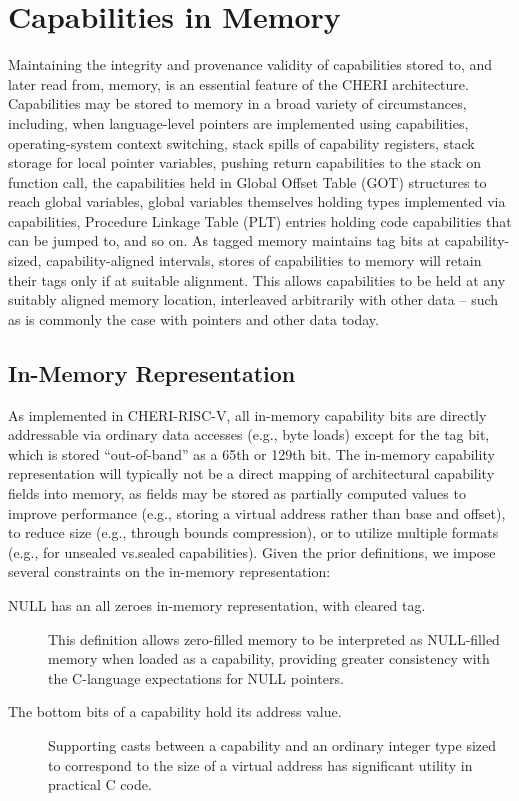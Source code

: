 \section{Capabilities in Memory}

Maintaining the integrity and provenance validity of capabilities stored to,
and later read from, memory, is an essential feature of the CHERI
architecture.
Capabilities may be stored to memory in a broad variety of circumstances,
including, when language-level pointers are implemented using capabilities,
operating-system context switching, stack spills of capability registers,
stack storage for local pointer variables, pushing return capabilities to the
stack on function call, the capabilities held in Global Offset Table (GOT)
structures to reach global variables, global variables themselves holding
types implemented via capabilities, Procedure Linkage Table (PLT) entries
holding code capabilities that can be jumped to, and so on.
As tagged memory maintains tag bits at capability-sized, capability-aligned
intervals, stores of capabilities to memory will retain their tags only if
at suitable alignment.
This allows capabilities to be held at any suitably aligned memory location,
interleaved arbitrarily with other data -- such as is commonly the case with
pointers and other data today.

\subsection{In-Memory Representation}

As implemented in CHERI-RISC-V, all in-memory capability bits
are directly addressable via ordinary data accesses (e.g., byte loads) except
for the tag bit, which is stored ``out-of-band'' as a 65th or 129th bit.
The in-memory capability representation will typically not be a direct mapping
of architectural capability fields into memory, as fields may be stored as
partially computed values to improve performance (e.g., storing a virtual
address rather than base and offset), to reduce size (e.g., through bounds
compression), or to utilize multiple formats (e.g., for unsealed vs.\@ sealed
capabilities).
Given the prior definitions, we impose several constraints on the in-memory
representation:

\begin{description}
\item[NULL has an all zeroes in-memory representation, with cleared tag.]
  This definition allows zero-filled memory to be interpreted as NULL-filled
  memory when loaded as a capability, providing greater consistency with the
  C-language expectations for NULL pointers.

\item[The bottom \xlen{} bits of a capability hold its address value.]
  Supporting casts between a capability and an ordinary integer type sized to
  correspond to the size of a virtual address has significant utility in
  practical C code.
\end{description}

